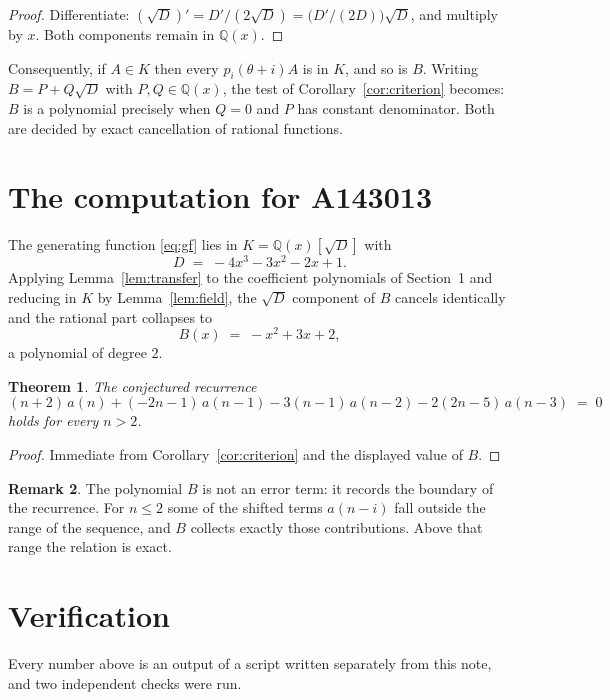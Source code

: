 \documentclass[11pt,a4paper]{article}
\theoremstyle{plain}
\newtheorem{theorem}{Theorem}
\theoremstyle{definition}
\newtheorem{remark}[theorem]{Remark}
\begin{document}
\begin{proof}
Differentiate: $(\sqrt{D})'=D'/(2\sqrt{D})=\bigl(D'/(2D)\bigr)\sqrt{D}$, and multiply by
$x$. Both components remain in $\mathbb{Q}(x)$.
\end{proof}

Consequently, if $A\in K$ then every $p_{i}(\theta+i)A$ is in $K$, and so is $B$. Writing
$B=P+Q\sqrt{D}$ with $P,Q\in\mathbb{Q}(x)$, the test of Corollary~\ref{cor:criterion}
becomes: $B$ is a polynomial precisely when $Q=0$ and $P$ has constant denominator. Both
are decided by exact cancellation of rational functions.

\section{The computation for A143013}

The generating function \eqref{eq:gf} lies in $K=\mathbb{Q}(x)[\sqrt{D}]$ with
\[
D \;=\; - 4 x^{3} - 3 x^{2} - 2 x + 1 .
\]
Applying Lemma~\ref{lem:transfer} to the coefficient polynomials of Section~1 and reducing
in $K$ by Lemma~\ref{lem:field}, the $\sqrt{D}$ component of $B$ cancels identically and
the rational part collapses to
\[
B(x)\;=\;- x^{2} + 3 x + 2 ,
\]
a polynomial of degree $2$.

\begin{theorem}
The conjectured recurrence
\[
(n + 2)\,a(n) + (- 2 n - 1)\,a(n-1) -  3 \left(n - 1\right)\,a(n-2) -  2 \left(2 n - 5\right)\,a(n-3) \;=\;0
\]
holds for every $n>2$.
\end{theorem}

\begin{proof}
Immediate from Corollary~\ref{cor:criterion} and the displayed value of $B$.
\end{proof}

\begin{remark}
The polynomial $B$ is not an error term: it records the boundary of the recurrence. For
$n\le2$ some of the shifted terms $a(n-i)$ fall outside the range of the sequence,
and $B$ collects exactly those contributions. Above that range the relation is exact.
\end{remark}

\section{Verification}

Every number above is an output of a script written separately from this note, and two
independent checks were run.
\end{document}
